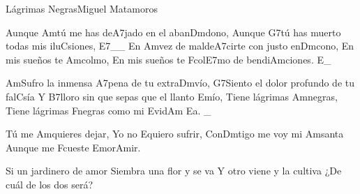 \begin{musica}{Lágrimas Negras}{Miguel Matamoros}{}

Aunque \ac{Am}{tú} me has de\ac{A7}{ja}do en el aban\ac{Dm}{do}no,
Aunque \ac{G7}{tú} has muerto todas mis ilu\ac{C}{sio}nes, \ac{E7}{}__
En \ac{Am}{vez} de malde\ac{A7}{cir}te con justo en\ac{Dm}{co}no,
En mis sueños te \ac{Am}{col}mo,
En mis sueños te \ac{F}{co}l\ac{E7}{mo} de bendi\ac{Am}{cio}nes. \ac{E}{}_

\ac{Am}{Su}fro la inmensa \ac{A7}{pe}na de tu extra\ac{Dm}{vío},
\ac{G7}{Si}ento el dolor profundo de tu fal\ac{C}{sía}
Y \ac{B7}{llo}ro sin que sepas que el llanto \ac{E}{mío},
Tiene lágrimas \ac{Am}{ne}gras,
Tiene lágrimas \ac{F}{ne}gras como mi \ac{E}{vi}d\ac{Am E}{a}. _


Tú me \ac{Am}{quie}res dejar,
Yo no \ac{E}{quie}ro sufrir,
Con\ac{Dm}{ti}go me voy mi \ac{Am}{san}ta
Aunque me \ac{F}{cues}te \ac{E}{mo}r\ac{Am}{ir}.

Si un jardinero de amor
Siembra una flor y se va
Y otro viene y la cultiva
¿De cuál de los dos será?

\end{musica}
